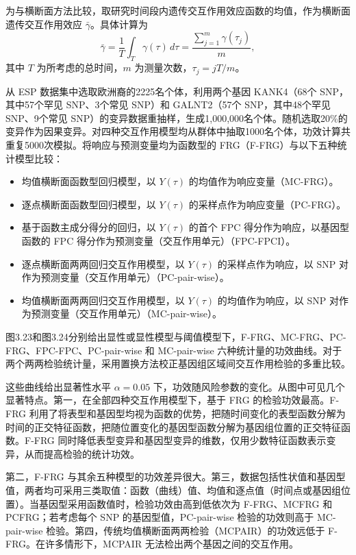 为与横断面方法比较，取研究时间段内遗传交互作用效应函数的均值，作为横断面遗传交互作用效应 $\bar\gamma$。具体计算为
\[
\bar\gamma=\frac1T\int_T\gamma(\tau)\,d\tau
=\frac{\sum_{j=1}^{m}\gamma(\tau_j)}{m},
\]
其中 $T$ 为所考虑的总时间，$m$ 为测量次数，$\tau_j=jT/m$。



从 ESP 数据集中选取欧洲裔的2225名个体，利用两个基因 KANK4（68个 SNP，其中57个罕见 SNP、3个常见 SNP）和 GALNT2（57个 SNP，其中48个罕见 SNP、9个常见 SNP）的变异数据重抽样，生成1,000,000名个体。随机选取20\%的变异作为因果变异。对四种交互作用模型均从群体中抽取1000名个体，功效计算共重复5000次模拟。将响应与预测变量均为函数型的 FRG（F-FRG）与以下五种统计模型比较：
\begin{itemize}
\item 均值横断面函数型回归模型，以 $Y(\tau)$ 的均值作为响应变量（MC-FRG）。
\item 逐点横断面函数型回归模型，以 $Y(\tau)$ 的采样点作为响应变量（PC-FRG）。
\item 基于函数主成分得分的回归，以 $Y(\tau)$ 的首个 FPC 得分作为响应，以基因型函数的 FPC 得分作为预测变量（交互作用单元）（FPC-FPCI）。
\item 逐点横断面两两回归交互作用模型，以 $Y(\tau)$ 的采样点作为响应，以 SNP 对作为预测变量（交互作用单元）（PC-pair-wise）。
\item 均值横断面两两回归交互作用模型，以 $Y(\tau)$ 的均值作为响应，以 SNP 对作为预测变量（交互作用单元）（MC-pair-wise）。
\end{itemize}

图3.23和图3.24分别给出显性或显性模型与阈值模型下，F-FRG、MC-FRG、PC-FRG、FPC-FPC、PC-pair-wise 和 MC-pair-wise 六种统计量的功效曲线。对于两个两两检验统计量，采用置换方法校正基因组区域间交互作用检验的多重比较。




这些曲线给出显著性水平 $\alpha=0.05$ 下，功效随风险参数的变化。从图中可见几个显著特点。第一，在全部四种交互作用模型下，基于 FRG 的检验功效最高。F-FRG 利用了将表型和基因型均视为函数的优势，把随时间变化的表型函数分解为时间的正交特征函数，把随位置变化的基因型函数分解为基因组位置的正交特征函数。F-FRG 同时降低表型变异和基因型变异的维数，仅用少数特征函数表示变异，从而提高检验的统计功效。

第二，F-FRG 与其余五种模型的功效差异很大。第三，数据包括性状值和基因型值，两者均可采用三类取值：函数（曲线）值、均值和逐点值（时间点或基因组位置）。当基因型采用函数值时，检验功效由高到低依次为 F-FRG、MCFRG 和 PCFRG；若考虑每个 SNP 的基因型值，PC-pair-wise 检验的功效则高于 MC-pair-wise 检验。第四，传统均值横断面两两检验（MCPAIR）的功效远低于 F-FRG。在许多情形下，MCPAIR 无法检出两个基因之间的交互作用。
\FloatBarrier

